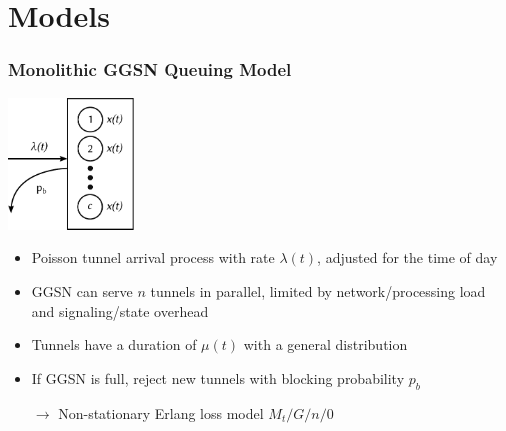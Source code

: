 \documentclass{beamer}
\begin{document}
\section{Models}


\begin{frame}
	\frametitle{Monolithic GGSN Queuing Model}
		\begin{center}
			\includegraphics[height=3.5cm]{../../chapters/04-mobilenets/images/ggsn-monolithic.pdf}
		\end{center}

		\begin{itemize}
			\item Poisson tunnel arrival process with rate $\lambda(t)$, adjusted for the time of day
			\item GGSN can serve $n$ tunnels in parallel, limited by network/processing load and signaling/state overhead
			\item Tunnels have a duration of $\mu(t)$ with a general distribution
			\item If GGSN is full, reject new tunnels with blocking probability $p_b$
			\item[$\rightarrow$] Non-stationary Erlang loss model $M_t/G/n/0$ 
		\end{itemize}

\end{frame}
\end{document}
